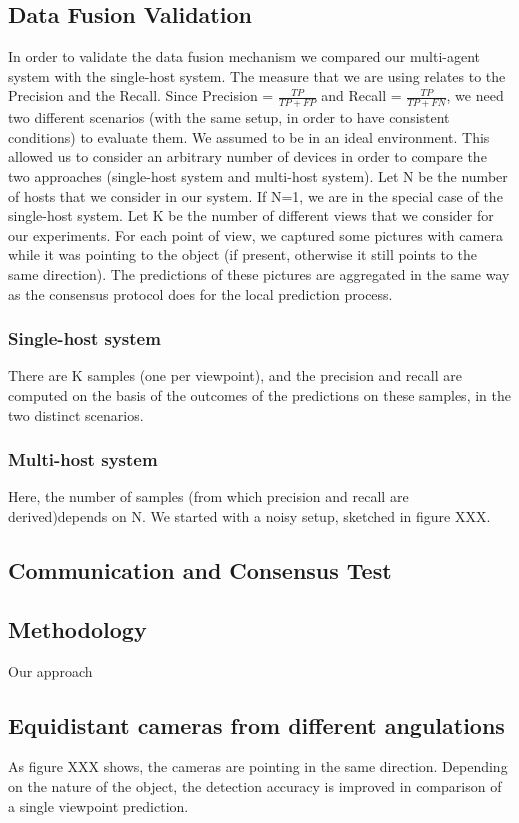 \documentclass[10pt,conference,compsocconf]{IEEEtran}
\begin{document}
\subsection{Data Fusion Validation}
In order to validate the data fusion mechanism we compared our multi-agent system with the single-host system. The measure that we are using relates to the Precision and the Recall. Since Precision = $\frac{TP}{TP+FP}$ and Recall = $\frac{TP}{TP+FN}$, we need two different scenarios (with the same setup, in order to have consistent conditions) to evaluate them.
We assumed to be in an ideal environment. This allowed us to consider an arbitrary number of devices in order to compare the two approaches (single-host system and multi-host system). Let N be the number of hosts that we consider in our system. If N=1, we are in the special case of the single-host system. Let K be the number of different views that we consider for our experiments. For each point of view, we captured some pictures with camera while it was pointing to the object (if present, otherwise it still points to the same direction). The predictions of these pictures are aggregated in the same way as the consensus protocol does for the local prediction process.
\subsubsection{Single-host system}There are K samples (one per viewpoint), and the precision and recall are computed on the basis of the outcomes of the predictions on these samples, in the two distinct scenarios.
\subsubsection{Multi-host system}
Here, the number of samples (from which precision and recall are derived)depends on N.
We started with a noisy setup, sketched in figure XXX. 
\subsection{Communication and Consensus Test}
\subsection{Methodology}
Our approach 
\subsection{Equidistant cameras from different angulations}
As figure XXX shows, the cameras are pointing in the same direction. Depending on the nature of the object, the detection accuracy is improved in comparison of a single viewpoint prediction. 
\end{document}
